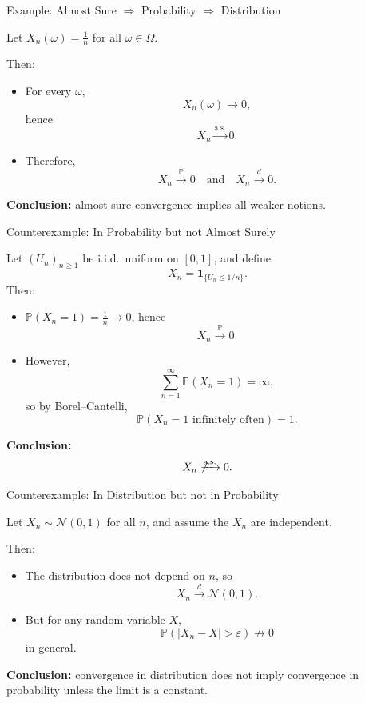 \documentclass[aspectratio=169]{beamer}
\begin{document}
\begin{frame}{Example: Almost Sure $\Rightarrow$ Probability $\Rightarrow$ Distribution}

Let \(X_n(\omega)=\frac{1}{n}\) for all \(\omega\in\Omega\).
\pause
\medskip

Then:
\begin{itemize}
  \item For every \(\omega\),
  \[
    X_n(\omega)\to 0,
  \]
  hence
  \[
    X_n \xrightarrow{\text{a.s.}} 0.
  \]
  \item Therefore,
  \[
    X_n \xrightarrow{\mathbb{P}} 0
    \quad\text{and}\quad
    X_n \xrightarrow{d} 0.
  \]
\end{itemize}

\medskip

\textbf{Conclusion:} almost sure convergence implies all weaker notions.

\end{frame}

\begin{frame}{Counterexample: In Probability but not Almost Surely}

Let \((U_n)_{n\ge1}\) be i.i.d.\ uniform on \([0,1]\), and define
\[
X_n = \mathbf{1}_{\{U_n \le 1/n\}}.
\]
\pause
Then:
\begin{itemize}
  \item \(\mathbb{P}(X_n=1)=\frac{1}{n}\to0\), hence
  \[
    X_n \xrightarrow{\mathbb{P}} 0.
  \]
  \item However,
  \[
    \sum_{n=1}^\infty \mathbb{P}(X_n=1)=\infty,
  \]
  so by Borel--Cantelli,
  \[
    \mathbb{P}(X_n=1 \text{ infinitely often})=1.
  \]
\end{itemize}
\pause
\medskip

\textbf{Conclusion:}
\[
X_n \not\xrightarrow{\text{a.s.}} 0.
\]

\end{frame}

\begin{frame}{Counterexample: In Distribution but not in Probability}

Let \(X_n\sim \mathcal{N}(0,1)\) for all \(n\), and assume the \(X_n\) are independent.
\pause
\medskip

Then:
\begin{itemize}
  \item The distribution does not depend on \(n\), so
  \[
    X_n \xrightarrow{d} \mathcal{N}(0,1).
  \]
  \item But for any random variable \(X\),
  \[
    \mathbb{P}(|X_n-X|>\varepsilon) \not\to 0
  \]
  in general.
\end{itemize}
\pause
\medskip

\textbf{Conclusion:}
convergence in distribution does not imply convergence in probability
unless the limit is a constant.

\end{frame}
\end{document}
